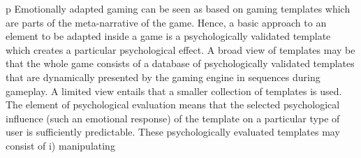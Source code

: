p Emotionally adapted gaming can be seen as based on gaming templates which are parts of the meta-narrative of the game. Hence, a basic approach to an element to be adapted inside a game is a psychologically validated template which creates a particular psychological effect. A broad view of templates may be that the whole game consists of a database of psychologically validated templates that are dynamically presented by the gaming engine in sequences during gameplay. A limited view entails that a smaller collection of templates is used. The element of psychological evaluation means that the selected psychological influence (such an emotional response) of the template on a particular type of user is sufficiently predictable. These psychologically evaluated templates may consist of i) manipulating

